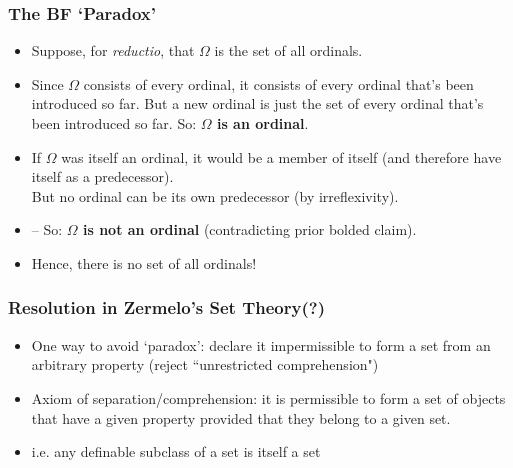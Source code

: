 \begin{frame}
\frametitle{The BF `Paradox'}

\begin{itemize}[<+->]

\item Suppose, for \textit{reductio}, that $\Omega$ is the set of all ordinals.

\item Since $\Omega$ consists of every ordinal, it consists of every ordinal that's been introduced so far. But a new ordinal is just the set of every ordinal that's been introduced so far. So: \textbf{$\Omega$  is an ordinal}.

\item If $\Omega$ was itself an ordinal, it would be a member of itself (and therefore have itself as a predecessor). \\ But no ordinal can be its own predecessor (by irreflexivity). 
\item[] -- So: \textbf{$\Omega$  is not an ordinal} (contradicting prior bolded claim).

\item Hence, there is no set of all ordinals!

\end{itemize}
\end{frame}

\begin{frame}
\frametitle{Resolution in Zermelo's Set Theory(?)}

\begin{itemize}[<+->]

\item One way to avoid `paradox': declare it impermissible to form a set from an arbitrary property (reject ``unrestricted comprehension")

\item Axiom of separation/comprehension: it is permissible to form a set of objects that have a given property provided that they belong to a given set. 

\item i.e. any definable subclass of a set is itself a set 

\end{itemize}
\end{frame}

